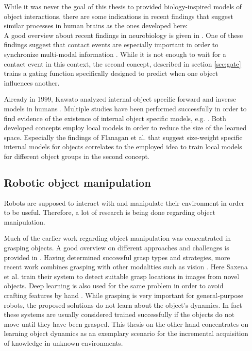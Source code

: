 While it was never the goal of this thesis to provided biology-inspired models of object interactions, there are some indications in recent findings that suggest similar processes in human brains as the ones developed here: \\
A good overview about recent findings in neurobiology is given in \cite{flanagan2006control}. One of these findings suggest that contact events are especially important in order to synchronize multi-modal information \cite{johansson2001eye}. 
While it is not enough to wait for a contact event in this context, the second concept, described in section \ref{sec:gate} trains a gating function specifically designed to predict when one object influences another.

Already in 1999, Kawato analyzed internal object specific forward and inverse models in humans \cite{kawato1999internal}. Multiple studies have been performed successfully in order to find evidence of the existence of internal object specific models, e.g. \cite{flanagan2001sensorimotor, merfeld1999humans}.
Both developed concepts employ local models in order to reduce the size of the learned space. Especially the findings of Flanagan et al. \cite{flanagan2001sensorimotor} that suggest size-weight specific internal models for objects correlates to the employed idea to train local models for different object groups in the second concept.

\subsection{Robotic object manipulation}

Robots are supposed to interact with and manipulate their environment in order to be useful. Therefore, a lot of research is being done regarding object manipulation.

Much of the earlier work regarding object manipulation was concentrated in grasping objects. A good overview on different approaches and challenges is provided in \cite{graspingReview}. Having determined successful grasp types and strategies, more recent work combines grasping with other modalities such as vision \cite{graspingVision}. Here Saxena et al. train their system to detect suitable grasp locations in images from novel objects.
Deep learning is also used for the same problem in order to avoid crafting features by hand \cite{graspingDeep}. 
While grasping is very important for general-purpose robots, the proposed solutions do not learn about the object's dynamics. In fact these systems are usually considered trained successfully if the objects do not move until they have been grasped. 
This thesis on the other hand concentrates on learning object dynamics as an exemplary scenario for the incremental acquisition of knowledge in unknown environments.

